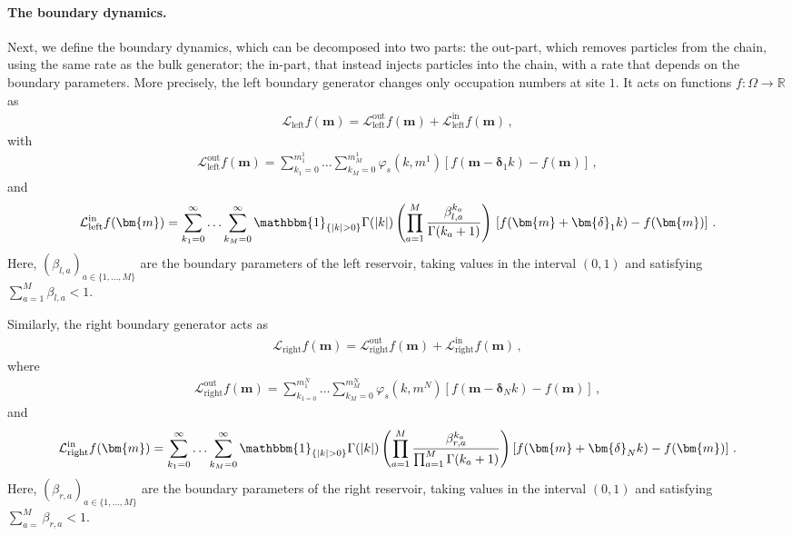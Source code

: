 \documentclass[11pt]{article}
\numberwithin{equation}{section}
\newcommand{\M}{M}
\newcommand{\N}{N}
\newcommand{\eL}{\mathcal{L}}
\begin{document}
\paragraph{The boundary dynamics.}
Next, we define the boundary dynamics, which can be decomposed into two parts: the out-part, which removes particles from the chain, using the same rate as the bulk generator; the in-part, that instead injects particles into the chain, with a rate that depends on the boundary parameters. More precisely,
the left boundary generator changes only occupation numbers at site $1$. It acts
on functions $f:\Omega \to \mathbb{R}$
as
\begin{align}\label{left-boundary-generator}
	\eL_{\text{left}}f(\bm{m})=\eL_{\text{left}}^{\text{out}}f(\bm{m})+\eL_{\text{left}}^{\text{in}}f(\bm{m})\,,
\end{align}
with
\begin{align}\label{boundary-out-generator}
	\eL_{\text{left}}^{\text{out}}f(\bm{m})=\sum_{k_1=0}^{m_{1}^{1}}\ldots\sum_{k_{\M}=0}^{m_{\M}^{1}}\varphi_{s}(k,m^{1})\left[f(\bm{m}-\bm{\delta}_{1}k)-f(\bm{m})\right]\,,
\end{align}
and 
\begin{align}\label{boundary-in-generator}
\eL_{\text{left}}^{\text{in}}f(\bm{m})=\sum_{k_{1}=0}^{\infty}\ldots\sum_{k_{\M}=0}^{\infty}\mathbbm{1}_{\{|k|>0\}}\Gamma(|k|)\left(\prod_{a=1}^{\M}\frac{\beta_{l,a}^{k_{a}}}{\Gamma(k_{a}+1)}\right)\,\left[f(\bm{m}+\bm{\delta}_{1}k)-f(\bm{m})\right]\,.
\end{align}
Here, $(\beta_{l,a})_{a\in \{1,\ldots,\M\}}$ are the boundary parameters of the left reservoir, taking values in the interval $(0,1)$ and satisfying $\sum_{a=1}^{\M}\beta_{l,a}<1$. 

Similarly, the right boundary generator acts as
\begin{align}\label{right-boundary-generator}
	\eL_{\text{right}}f(\bm{m})=\eL_{\text{right}}^{\text{out}}f(\bm{m})+\eL_{\text{right}}^{\text{in}}f(\bm{m})\,,
\end{align}
where
\begin{align}
\eL_{\text{right}}^{\text{out}}f(\bm{m})=\sum_{k_{1=0}}^{m_{1}^{\N}}\ldots\sum_{k_{\M}=0}^{m_{\M}^{\N}}\varphi_{s}(k,m^{\N})\left[f(\bm{m}-\bm{\delta}_{\N}k)-f(\bm{m})\right]\,,
\end{align}
and
\begin{align}\label{boundary-right-in}
	\eL_{\text{right}}^{\text{in}}f(\bm{m})=\sum_{k_{1}=0}^{\infty}\ldots\sum_{k_{\M}=0}^{\infty}\mathbbm{1}_{\{|k|>0\}}\Gamma(|k|)\left(\prod_{a=1}^{\M}\frac{\beta_{r,a}^{k_{a}}}{\prod_{a=1}^{\M}\Gamma(k_{a}+1)}\right)\left[f(\bm{m}+\bm{\delta}_{\N}k)-f(\bm{m})\right]\,.
\end{align}
Here, $(\beta_{r,a})_{a\in \{1,\ldots,\M\}}$ are the boundary parameters of the right reservoir,  taking values in the interval $(0,1)$ and satisfying $\sum_{a=}^{\M}\beta_{r,a}<1$.
\end{document}
